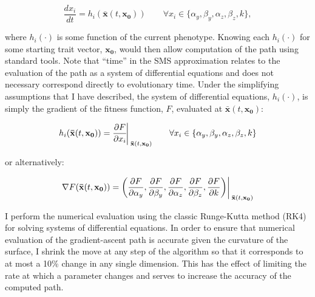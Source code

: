 \documentclass[dvips,12pt,twoside,titlepage]{article}
\begin{document}
\begin{displaymath}
\frac{dx_i}{dt} = h_i(\mathbf{\bar{x}}(t,\mathbf{x_0})) \qquad \forall x_i \in \{\alpha_y, \beta_y, \alpha_z, \beta_z, k\},
\end{displaymath}

\vspace{0.6cm}

\noindent where $h_i(\cdot)$ is some function of the current phenotype. Knowing each $h_i(\cdot)$ for some starting trait vector, $\mathbf{x_0}$, would then allow computation of the path using standard tools.
Note that ``time'' in the SMS approximation relates to the evaluation of the path as a system of differential equations and does not necessary correspond directly to evolutionary time.
Under the simplifying assumptions that I have described, the system of differential equations, $h_i(\cdot)$, is simply the gradient of the fitness function, $F$, evaluated at $\mathbf{\bar{x}}(t,\mathbf{x_0})$:

\begin{displaymath}
h_i(\mathbf{\bar{x}}(t,\mathbf{x_0})) = \frac{\partial F}{\partial x_i} \rule[-1.1em]{0.5pt}{2.6em}_{\ \mathbf{\bar{x}}(t,\mathbf{x_0})} \qquad \forall x_i \in \{\alpha_y, \beta_y, \alpha_z, \beta_z, k\}
\end{displaymath}

\vspace{0.6cm}

\noindent or alternatively:

\begin{displaymath}
\nabla F(\mathbf{\bar{x}}(t,\mathbf{x_0})) = \left( \frac{\partial F}{\partial \alpha_y},\frac{\partial F}{\partial \beta_y},\frac{\partial F}{\partial \alpha_z},\frac{\partial F}{\partial \beta_z},\frac{\partial F}{\partial k} \right)\rule[-1.1em]{0.5pt}{2.6em}_{\ \mathbf{\bar{x}}(t,\mathbf{x_0})}
\end{displaymath}

\vspace{0.6cm}

I perform the numerical evaluation using the classic Runge-Kutta method (RK4) for solving systems of differential equations. 
In order to ensure that numerical evaluation of the gradient-ascent path is accurate given the curvature of the surface, I shrink the move at any step of the algorithm so that it corresponds to at most a 10\% change in any single dimension.
This has the effect of limiting the rate at which a parameter changes and serves to increase the accuracy of the computed path. 
\end{document}
